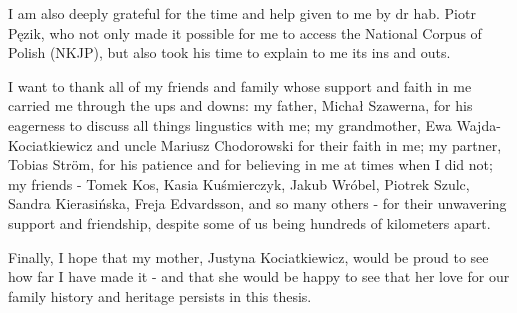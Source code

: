 \documentclass[12pt, a4paper]{article}  %
\begin{document}
I am also deeply grateful for the time and help given to me by dr hab. Piotr Pęzik, who not only made it possible for me to access the National Corpus of Polish (NKJP), but also took his time to explain to me its ins and outs.

I want to thank all of my friends and family whose support and faith in me carried me through the ups and downs: my father, Michał Szawerna, for his eagerness to discuss all things lingustics with me; my grandmother, Ewa Wajda-Kociatkiewicz and uncle Mariusz Chodorowski for their faith in me; my partner, Tobias Ström, for his patience and for believing in me at times when I did not; my friends - Tomek Kos, Kasia Kuśmierczyk, Jakub Wróbel, Piotrek Szulc, Sandra Kierasińska, Freja Edvardsson, and so many others - for their unwavering support and friendship, despite some of us being hundreds of kilometers apart.

Finally, I hope that my mother, Justyna Kociatkiewicz, would be proud to see how far I have made it - and that she would be happy to see that her love for our family history and heritage persists in this thesis.

\thispagestyle{empty}

\newpage
\thispagestyle{empty}
\begingroup
\hypersetup{linkcolor=black} %
\begin{spacing}{0.0}
\tableofcontents
\thispagestyle{empty}
\end{spacing}
\newpage
\thispagestyle{empty}
\listoffigures
\newpage
\thispagestyle{empty}
\listoftables
\endgroup
\thispagestyle{empty}

\newpage
\setcounter{page}{1}






\newpage


\end{document}
